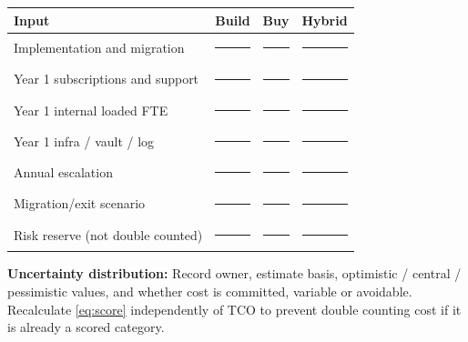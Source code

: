 \documentclass[10pt,letterpaper]{article}
\begin{document}
\begin{tabularx}{\linewidth}{@{}L{2.45in}YYY@{}}
\toprule
\textbf{Input} & \textbf{Build} & \textbf{Buy} & \textbf{Hybrid}\\\midrule
Implementation and migration & \rule{0.85in}{0.4pt} & \rule{0.85in}{0.4pt} & \rule{0.85in}{0.4pt}\\[1pt]
Year 1 subscriptions and support & \rule{0.85in}{0.4pt} & \rule{0.85in}{0.4pt} & \rule{0.85in}{0.4pt}\\[1pt]
Year 1 internal loaded FTE & \rule{0.85in}{0.4pt} & \rule{0.85in}{0.4pt} & \rule{0.85in}{0.4pt}\\[1pt]
Year 1 infra / vault / log & \rule{0.85in}{0.4pt} & \rule{0.85in}{0.4pt} & \rule{0.85in}{0.4pt}\\[1pt]
Annual escalation & \rule{0.85in}{0.4pt} & \rule{0.85in}{0.4pt} & \rule{0.85in}{0.4pt}\\[1pt]
Migration/exit scenario & \rule{0.85in}{0.4pt} & \rule{0.85in}{0.4pt} & \rule{0.85in}{0.4pt}\\[1pt]
Risk reserve (not double counted) & \rule{0.85in}{0.4pt} & \rule{0.85in}{0.4pt} & \rule{0.85in}{0.4pt}\\[1pt]
\bottomrule
\end{tabularx}
\textbf{Uncertainty distribution:} Record owner, estimate basis, optimistic / central / pessimistic values, and whether cost is committed, variable or avoidable. Recalculate \cref{eq:score} independently of TCO to prevent double counting cost if it is already a scored category.
\end{document}
